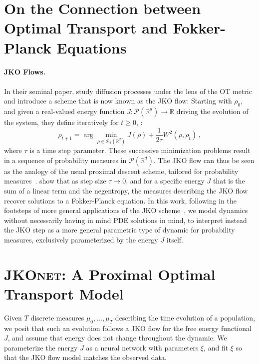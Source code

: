 \section[On the Connection between OT and Fokker-Planck Equations]{On the Connection between Optimal Transport and Fokker-Planck Equations}

\paragraph{JKO Flows.}
In their seminal paper, \citet{jordan1998variational} study diffusion processes under the lens of the OT metric \citep[see also][]{ambrosio2006gradient} and introduce a scheme that is now known as the \acrshort{JKO} flow: Starting with $\rho_0$, and given a real-valued energy function $J:\mathcal{P}(\mathbb{R}^d)\rightarrow \mathbb{R}$ driving the evolution of the system, they define iteratively for $t\geq 0$, :
\begin{equation} \label{eq:jko}
    \rho_{t+1} = \arg \min_{\rho\in \mathcal{P}_2(\mathbb{R}^d)} J(\rho) + \frac{1}{2\tau} W^2(\rho, \rho_{t})\,,
\end{equation}
where $\tau$ is a time step parameter. These successive minimization problems result in a sequence of probability measures in $\mathcal{P}(\mathbb{R}^d)$. The \acrshort{JKO} flow can thus be seen as the analogy of the usual proximal descent scheme, tailored for probability measures~\citep[p.285]{santambrogio2015optimal}. \citet{jordan1998variational} show that as step size $\tau \rightarrow 0$, and for a specific energy $J$ that is the sum of a linear term and the negentropy, the measures describing the \acrshort{JKO} flow recover solutions to a Fokker-Planck equation. In this work, following in the footsteps of more general applications of the \acrshort{JKO} scheme~\citep[\S4.8]{santambrogio2017euclidean}, we model dynamics without necessarily having in mind PDE solutions in mind, to interpret instead the \acrshort{JKO} step as a more general parametric type of dynamic for probability measures, exclusively parameterized by the energy $J$ itself.


\section{\textsc{JKOnet}: A Proximal Optimal Transport Model} 

Given $T$ discrete measures $\mu_0, \dots, \mu_T$ describing the time evolution of a population, we posit that such an evolution follows a \acrshort{JKO} flow for the free energy functional $J$, and assume that energy does not change throughout the dynamic. We parameterize the energy $J$ as a neural network with parameters $\xi$, and fit $\xi$ so that the \acrshort{JKO} flow model matches the observed data. 

